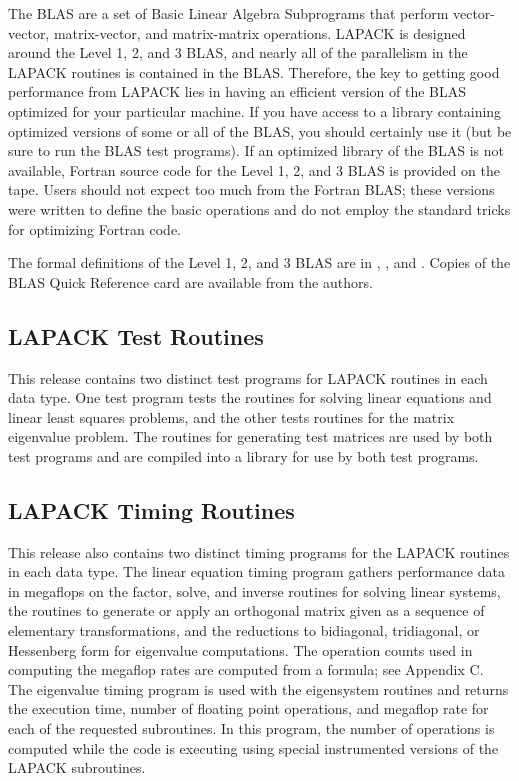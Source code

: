\hspace{\parindent}
The BLAS are a set of Basic Linear Algebra Subprograms that perform
vector-vector, matrix-vector, and matrix-matrix operations. 
LAPACK is designed around the Level 1, 2, and 3 BLAS, and nearly all
of the parallelism in the LAPACK routines is contained in the BLAS.
Therefore,
the key to getting good performance from LAPACK lies in having an
efficient version of the BLAS optimized for your particular machine. 
If you have access to a library containing optimized versions of some
or all of the BLAS, you should certainly use it (but be sure to run
the BLAS test programs).
If an optimized library of the BLAS is not available,
Fortran source code for the Level 1, 2, and 3 BLAS
is provided on the tape.
Users should not expect too much from the Fortran BLAS; these versions
were written to define the basic operations and do not employ the
standard tricks for optimizing Fortran code.

The formal definitions of the Level 1, 2, and 3 BLAS
are in \cite{BLAS1}, \cite{BLAS2}, and \cite{BLAS3}. 
Copies of the BLAS Quick Reference card are available from the authors.

\subsection{LAPACK Test Routines}

\hspace{\parindent}
This release contains two distinct test programs for LAPACK routines
in each data type.  One test program tests the routines for solving
linear equations and linear least squares problems,
and the other tests routines for the matrix eigenvalue problem.
The routines for generating test matrices are used by both test
programs and are compiled into a library for use by both test programs.

\subsection{LAPACK Timing Routines}

\hspace{\parindent}
This release also contains two distinct timing programs for the
LAPACK routines in each data type. 
The linear equation timing program gathers performance data in
megaflops on the factor, solve, and inverse routines for solving
linear systems, the routines to generate or apply an orthogonal matrix
given as a sequence of elementary transformations, and the reductions
to bidiagonal, tridiagonal, or Hessenberg form for eigenvalue
computations.
The operation counts used in computing the megaflop rates are computed
from a formula; see Appendix C.
The eigenvalue timing program is used with the eigensystem routines
and returns the execution time, number of floating point operations, and
megaflop rate for each of the requested subroutines.
In this program, the number of operations is computed while the
code is executing using special instrumented versions of the LAPACK
subroutines.

